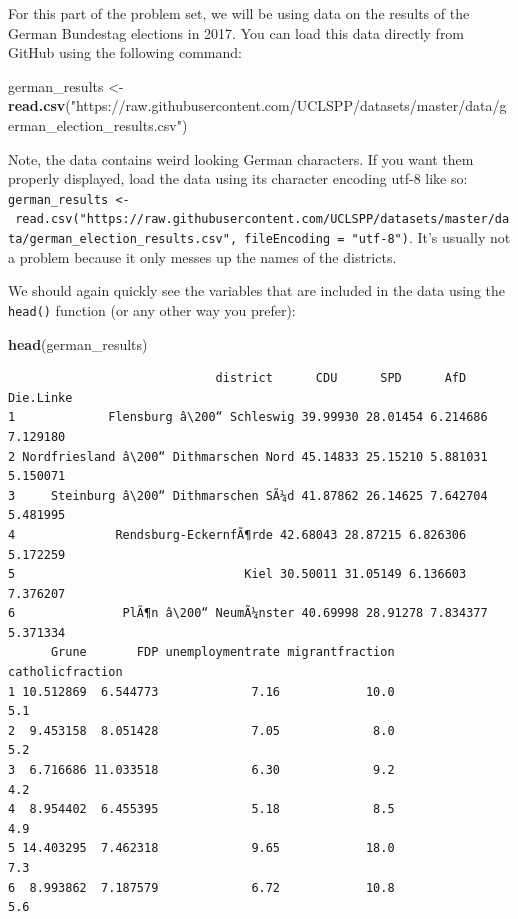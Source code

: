 \documentclass[]{article}
\newenvironment{Shaded}{\begin{snugshade}}{\end{snugshade}}
\newcommand{\KeywordTok}[1]{\textcolor[rgb]{0.13,0.29,0.53}{\textbf{#1}}}
\newcommand{\StringTok}[1]{\textcolor[rgb]{0.31,0.60,0.02}{#1}}
\newcommand{\NormalTok}[1]{#1}
\theoremstyle{definition}
\theoremstyle{definition}
\theoremstyle{definition}
\theoremstyle{remark}
\begin{document}
For this part of the problem set, we will be using data on the results
of the German Bundestag elections in 2017. You can load this data
directly from GitHub using the following command:

\begin{Shaded}
\begin{Highlighting}[]
\NormalTok{german_results <-}\StringTok{ }\KeywordTok{read.csv}\NormalTok{(}\StringTok{"https://raw.githubusercontent.com/UCLSPP/datasets/master/data/german_election_results.csv"}\NormalTok{) }
\end{Highlighting}
\end{Shaded}

Note, the data contains weird looking German characters. If you want
them properly displayed, load the data using its character encoding
utf-8 like so:
\texttt{german\_results\ \textless{}-\ read.csv("https://raw.githubusercontent.com/UCLSPP/datasets/master/data/german\_election\_results.csv",\ fileEncoding\ =\ "utf-8")}.
It's usually not a problem because it only messes up the names of the
districts.

We should again quickly see the variables that are included in the data
using the \texttt{head()} function (or any other way you prefer):

\begin{Shaded}
\begin{Highlighting}[]
\KeywordTok{head}\NormalTok{(german_results)}
\end{Highlighting}
\end{Shaded}

\begin{verbatim}
                             district      CDU      SPD      AfD Die.Linke
1             Flensburg â\200“ Schleswig 39.99930 28.01454 6.214686  7.129180
2 Nordfriesland â\200“ Dithmarschen Nord 45.14833 25.15210 5.881031  5.150071
3     Steinburg â\200“ Dithmarschen SÃ¼d 41.87862 26.14625 7.642704  5.481995
4              Rendsburg-EckernfÃ¶rde 42.68043 28.87215 6.826306  5.172259
5                                Kiel 30.50011 31.05149 6.136603  7.376207
6               PlÃ¶n â\200“ NeumÃ¼nster 40.69998 28.91278 7.834377  5.371334
      Grune       FDP unemploymentrate migrantfraction catholicfraction
1 10.512869  6.544773             7.16            10.0              5.1
2  9.453158  8.051428             7.05             8.0              5.2
3  6.716686 11.033518             6.30             9.2              4.2
4  8.954402  6.455395             5.18             8.5              4.9
5 14.403295  7.462318             9.65            18.0              7.3
6  8.993862  7.187579             6.72            10.8              5.6
\end{verbatim}
\end{document}

